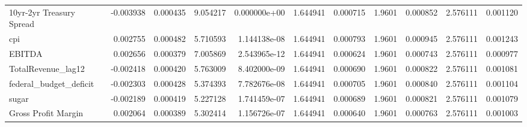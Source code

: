 \documentclass[12pt,a4paper,english]{article}
\begin{document}
{{\begin{tabular}{@{}lrrrrrrrrrr@{}}
			10yr-2yr Treasury Spread       & -0.003938                & 0.000435                    & 9.054217                  & 0.000000e+00                             & 1.644941                      & 0.000715                      & 1.9601                       & 0.000852                     & 2.576111                     & 0.001120                     \\
			cpi                            & 0.002755                 & 0.000482                    & 5.710593                  & 1.144138e-08                             & 1.644941                      & 0.000793                      & 1.9601                       & 0.000945                     & 2.576111                     & 0.001243                     \\
			EBITDA                         & 0.002656                 & 0.000379                    & 7.005869                  & 2.543965e-12                             & 1.644941                      & 0.000624                      & 1.9601                       & 0.000743                     & 2.576111                     & 0.000977                     \\
			TotalRevenue\_lag12            & -0.002418                & 0.000420                    & 5.763009                  & 8.402000e-09                             & 1.644941                      & 0.000690                      & 1.9601                       & 0.000822                     & 2.576111                     & 0.001081                     \\
			federal\_budget\_deficit       & -0.002303                & 0.000428                    & 5.374393                  & 7.782676e-08                             & 1.644941                      & 0.000705                      & 1.9601                       & 0.000840                     & 2.576111                     & 0.001104                     \\
			sugar                          & -0.002189                & 0.000419                    & 5.227128                  & 1.741459e-07                             & 1.644941                      & 0.000689                      & 1.9601                       & 0.000821                     & 2.576111                     & 0.001079                     \\
			Gross Profit Margin            & 0.002064                 & 0.000389                    & 5.302414                  & 1.156726e-07                             & 1.644941                      & 0.000640                      & 1.9601                       & 0.000763                     & 2.576111                     & 0.001003                     \\

\end{tabular}}}
\end{document}

